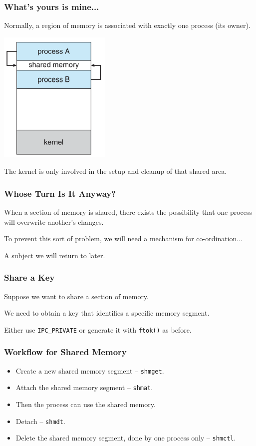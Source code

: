 \begin{frame}
	\frametitle{What's yours is mine...}

	Normally, a region of memory is associated with exactly one process (its owner).


	\begin{center}
		\includegraphics[width=0.4\textwidth]{images/shared-memory.png}
	\end{center}

	The kernel is only involved in the setup and cleanup of that shared area.

\end{frame}


\begin{frame}
	\frametitle{Whose Turn Is It Anyway?}

	When a section of memory is shared, there exists the possibility that one process will overwrite another's changes.

	To prevent this sort of problem, we will need a mechanism for co-ordination...

	A subject we will return to later.

\end{frame}


\begin{frame}[fragile]
	\frametitle{Share a Key}

	Suppose we want to share a section of memory.

	We need to obtain a key that identifies a specific memory segment.

Either use \texttt{IPC\_PRIVATE} or generate it with \texttt{ftok()} as before.

\end{frame}



\begin{frame}
	\frametitle{Workflow for Shared Memory}

	\begin{itemize}
		\item Create a new shared memory segment -- \texttt{shmget}.
		\item Attach the shared memory segment -- \texttt{shmat}.
		\item Then the process can use the shared memory.
		\item Detach -- \texttt{shmdt}.
		\item Delete the shared memory segment, done by one process only -- \texttt{shmctl}.
	\end{itemize}

\end{frame}


